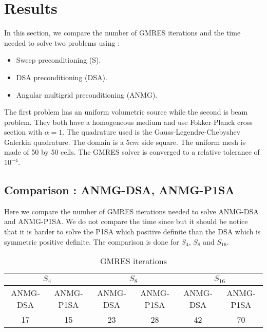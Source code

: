 \section{Results}
In this section, we compare the number of GMRES iterations and the time needed
to solve two problems using :
\begin{itemize}
\item Sweep preconditioning (S).
\item DSA preconditioning (DSA).
\item Angular multigrid preconditioning (ANMG).
\end{itemize}
The first problem has an uniform volumetric source while the second is beam
problem. They both have a homogeneous medium and use Fokker-Planck cross
section with $\alpha=1$. The quadrature used is the Gauss-Legendre-Chebyshev Galerkin
quadrature. The domain is a $5cm$ side square. The uniform mesh is made of 50 by 50 
cells. The GMRES solver is converged to a relative tolerance of $10^{-4}$.
\subsection{Comparison : ANMG-DSA, ANMG-P1SA}
Here we compare the number of GMRES iterations needed to solve ANMG-DSA and
ANMG-P1SA. We do not compare the time since but it should be notice that it is
harder to solve the P1SA which positive definite than the DSA which is
symmetric positive definite. The comparison is done for $S_4$, $S_8$ and
$S_{16}$.
\begin{table}[H]
\begin{center}
\begin{tabular}{|c|c|c|c|c|c|}
\hline
\multicolumn{2}{|c|}{$S_4$} & \multicolumn{2}{c|}{$S_8$} &
\multicolumn{2}{c|}{$S_{16}$}\\
\hline
ANMG-DSA & ANMG-P1SA & ANMG-DSA & ANMG-P1SA & ANMG-DSA & ANMG-P1SA\\
\hline
17 &  15 & 23 & 28 & 42 & 70\\
\hline
\end{tabular}
\caption{GMRES iterations}
\end{center}
\end{table}
